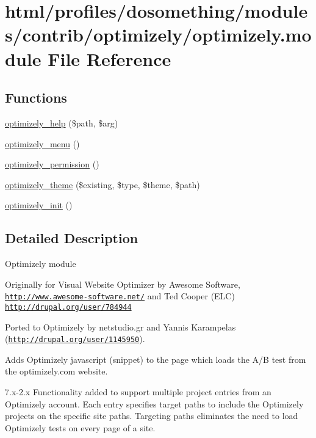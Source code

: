\hypertarget{optimizely_8module}{
\section{html/profiles/dosomething/modules/contrib/optimizely/optimizely.module File Reference}
\label{optimizely_8module}
}
\subsection*{Functions}
\begin{DoxyCompactItemize}
\item 
\hyperlink{optimizely_8module_a8f28de2408f1d21dc8026b1c5b4f37be}{optimizely\_\-help} (\$path, \$arg)
\item 
\hyperlink{optimizely_8module_a7411f84b7853003b0d2f0194ae41a0df}{optimizely\_\-menu} ()
\item 
\hyperlink{optimizely_8module_ae89dab888e84b13295533fcbc7117183}{optimizely\_\-permission} ()
\item 
\hyperlink{optimizely_8module_ae230656a97c5bda735c774bad1380d77}{optimizely\_\-theme} (\$existing, \$type, \$theme, \$path)
\item 
\hyperlink{optimizely_8module_a84b6132a6cd43fb33b4f482a0e4f7363}{optimizely\_\-init} ()
\end{DoxyCompactItemize}


\subsection{Detailed Description}
Optimizely module

Originally for Visual Website Optimizer by Awesome Software, \href{http://www.awesome-software.net/}{\tt http://www.awesome-\/software.net/} and Ted Cooper (ELC) \href{http://drupal.org/user/784944}{\tt http://drupal.org/user/784944}

Ported to Optimizely by netstudio.gr and Yannis Karampelas (\href{http://drupal.org/user/1145950}{\tt http://drupal.org/user/1145950}).

Adds Optimizely javascript (snippet) to the page which loads the A/B test from the optimizely.com website.

7.x-\/2.x Functionality added to support multiple project entries from an Optimizely account. Each entry specifies target paths to include the Optimizely projects on the specific site paths. Targeting paths eliminates the need to load Optimizely tests on every page of a site.

